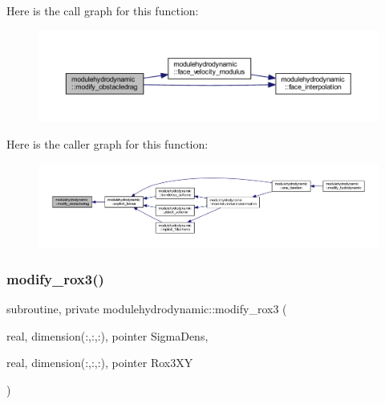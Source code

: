 Here is the call graph for this function\+:\nopagebreak
\begin{figure}[H]
\begin{center}
\leavevmode
\includegraphics[width=350pt]{namespacemodulehydrodynamic_a0305b5a5c3b3ae37a5cbe73fd9fe29c6_cgraph}
\end{center}
\end{figure}
Here is the caller graph for this function\+:\nopagebreak
\begin{figure}[H]
\begin{center}
\leavevmode
\includegraphics[width=350pt]{namespacemodulehydrodynamic_a0305b5a5c3b3ae37a5cbe73fd9fe29c6_icgraph}
\end{center}
\end{figure}
\mbox{\label{namespacemodulehydrodynamic_a9f3d6185fb652a067c6f42b46723a9cc}} 
\subsubsection{\texorpdfstring{modify\+\_\+rox3()}{modify\_rox3()}}
{\footnotesize\ttfamily subroutine, private modulehydrodynamic\+::modify\+\_\+rox3 (\begin{DoxyParamCaption}\item[{real, dimension(\+:,\+:,\+:), pointer}]{Sigma\+Dens,  }\item[{real, dimension(\+:,\+:,\+:), pointer}]{Rox3\+XY }\end{DoxyParamCaption})\hspace{0.3cm}{\ttfamily [private]}}


